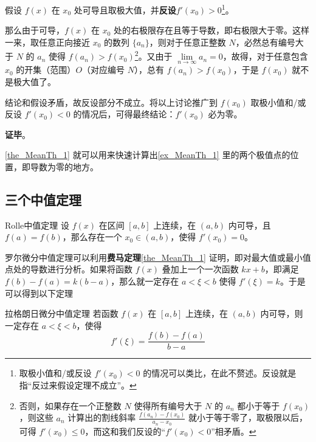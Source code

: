 假设 $f(x)$ 在 $x_0$ 处可导且取极大值，并\textbf{反设}$f'(x_0)>0$\footnote{取极小值和/或反设 $f'(x_0)<0$ 的情况可以类比，在此不赘述。反设就是指“反过来假设定理不成立”。}。

那么由于可导，$f(x)$ 在 $x_0$ 处的右极限存在且等于导数，即右极限大于零。这样一来，取任意正向接近 $x_0$ 的数列 $\{a_n\}$，则对于任意正整数 $N$，必然总有编号大于 $N$ 的 $a_n$ 使得 $f(a_n)>f(x_0)$\footnote{否则，如果存在一个正整数 $N$ 使得所有编号大于 $N$ 的 $a_n$ 都小于等于 $f(x_0)$，则这些 $a_n$ 计算出的割线斜率 $\frac{f(a_n)-f(x_0)}{a_n-x_0}$ 就小于等于零了，取极限以后，可得 $f'(x_0)\leq 0$，而这和我们反设的“$f'(x_0)<0$”相矛盾。}。又由于 $\lim\limits_{n\to\infty}a_n=0$，故得，对于任意包含 $x_0$ 的开集（范围）$O$（对应编号 $N$），总有 $f(a_n)>f(x_0)$，于是 $f(x_0)$ 就不是极大值了。

结论和假设矛盾，故反设部分不成立。将以上讨论推广到 $f(x_0)$ 取极小值和/或反设 $f'(x_0)<0$ 的情况后，可得最终结论：$f'(x_0)$ 必为零。

\textbf{证毕}。

\autoref{the_MeanTh_1} 就可以用来快速计算出\autoref{ex_MeanTh_1} 里的两个极值点的位置，即导数为零的地方。


\subsection{三个中值定理}


\begin{definition}{Rolle中值定理}
设 $f(x)$ 在区间 $[a, b]$ 上连续，在 $(a, b)$ 内可导，且 $f(a)=f(b)$，那么存在一个 $x_0\in(a, b)$，使得 $f'(x_0)=0$。
\end{definition}

罗尔微分中值定理可以利用\textbf{费马定理}\autoref{the_MeanTh_1} 证明，即对最大值或最小值点处的导数进行分析。如果将函数 $f(x)$ 叠加上一个一次函数 $kx+b$，即满足 $f(b)-f(a)=k(b-a)$，那么就一定存在 $a< \xi <b$ 使得 $f'(\xi)=k$。于是可以得到以下定理

\begin{theorem}{拉格朗日微分中值定理}\label{the_MeanTh_2}
若函数 $f(x)$ 在 $[a,b]$ 上连续，在 $(a,b)$ 内可导，则一定存在 $a< \xi <b$，使得
\begin{equation}\label{eq_MeanTh_2}
f'(\xi)=\frac{f(b)-f(a)}{b-a}
\end{equation}
\end{theorem}

